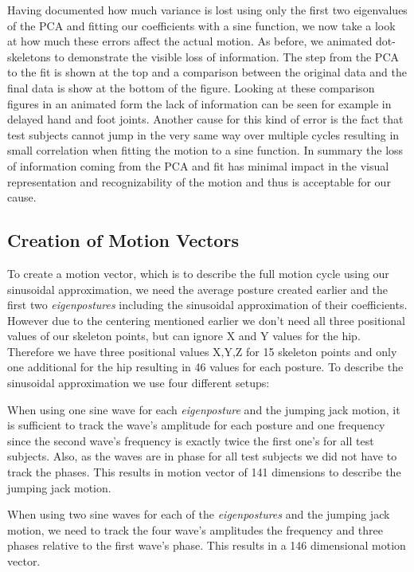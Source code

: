 \documentclass[a4paper]{article}
\begin{document}
Having documented how much variance is lost using only the first two eigenvalues of the PCA and fitting our coefficients with a sine function, we now take a look at how much these errors affect the actual motion.
As before, we animated dot-skeletons to demonstrate the visible loss of information.
The step from the PCA to the fit is shown at the top and a comparison between the original data and the final data is show at the bottom of the figure.
Looking at these comparison figures in an animated form the lack of information can be seen for example in delayed hand and foot joints.
Another cause for this kind of error is the fact that test subjects cannot jump in the very same way over multiple cycles resulting in small correlation when fitting the motion to a sine function.
In summary the loss of information coming from the PCA and fit has minimal impact in the visual representation and recognizability of the motion and thus is acceptable for our cause.


\subsection{Creation of Motion Vectors}
To create a motion vector, which is to describe the full motion cycle using our sinusoidal approximation, we need the average posture created earlier and the first two \emph{eigenpostures} including the sinusoidal approximation of their coefficients.
However due to the centering mentioned earlier we don't need all three positional values of our skeleton points, but can ignore X and Y values for the hip.
Therefore we have three positional values X,Y,Z for 15 skeleton points and only one additional for the hip resulting in 46 values for each posture.
To describe the sinusoidal approximation we use four different setups:

When using one sine wave for each \emph{eigenposture} and the jumping jack motion, it is sufficient to track the wave's amplitude for each posture and one frequency since the second wave's frequency is exactly twice the first one's for all test subjects.
Also, as the waves are in phase for all test subjects we did not have to track the phases.
This results in motion vector of 141 dimensions to describe the jumping jack motion.

When using two sine waves for each of the \emph{eigenpostures} and the jumping jack motion, we need to track the four wave's amplitudes the frequency and three phases relative to the first wave's phase.
This results in a 146 dimensional motion vector.
\end{document}
